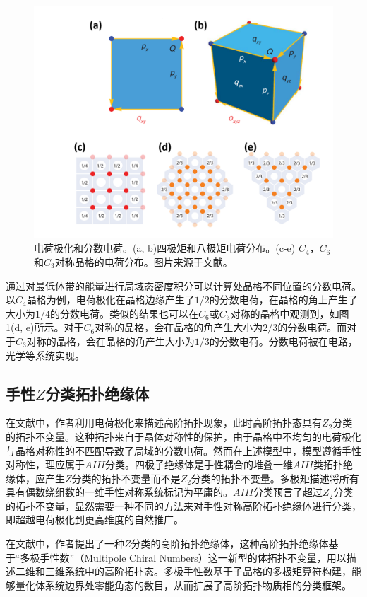 \begin{figure}[htbp]
    \centering
    \includegraphics[width=0.75\linewidth]{figure/Introduction/polarization.png}
    \caption{电荷极化和分数电荷。(a, b)四极矩和八极矩电荷分布。(c-e) $C_4$，$C_6$和$C_3$对称晶格的电荷分布。图片来源于文献\cite{benalcazar2019quantization}。}
    \label{fig:polarization}
\end{figure}

通过对最低体带的能量进行局域态密度积分可以计算处晶格不同位置的分数电荷。以$C_4$晶格为例，电荷极化在晶格边缘产生了$1/2$的分数电荷，在晶格的角上产生了大小为$1/4$的分数电荷。类似的结果也可以在$C_6$或$C_3$对称的晶格中观测到，如图\ref{fig:polarization}(d, e)所示。对于$C_6$对称的晶格，会在晶格的角产生大小为$2/3$的分数电荷。而对于$C_3$对称的晶格，会在晶格的角产生大小为$1/3$的分数电荷。分数电荷被在电路\cite{peterson2020fractional}，光学\cite{liu2021bulk}等系统实现。

\subsection{手性$Z$分类拓扑绝缘体}
在文献\cite{benalcazar2017quantized,benalcazar2019quantization}中，作者利用电荷极化来描述高阶拓扑现象，此时高阶拓扑态具有$Z_2$分类的拓扑不变量。这种拓扑来自于晶体对称性的保护，由于晶格中不均匀的电荷极化与晶格对称性的不匹配导致了局域的分数电荷。然而在上述模型中，模型遵循手性对称性，理应属于$AIII$分类。四极子绝缘体是手性耦合的堆叠一维$AIII$类拓扑绝缘体，应产生$Z$分类的拓扑不变量而不是$Z_2$分类的拓扑不变量\cite{benalcazar2022chiral}。多极矩描述将所有具有偶数绕组数的一维手性对称系统标记为平庸的。$AIII$分类预言了超过$Z_2$分类的拓扑不变量，显然需要一种不同的方法来对手性对称高阶拓扑绝缘体进行分类，即超越电荷极化到更高维度的自然推广。

在文献\cite{benalcazar2022chiral}中，作者提出了一种$Z$分类的高阶拓扑绝缘体，这种高阶拓扑绝缘体基于“多极手性数”（Multipole Chiral Numbers）这一新型的体拓扑不变量，用以描述二维和三维系统中的高阶拓扑态。多极手性数基于子晶格的多极矩算符构建，能够量化体系统边界处零能角态的数目，从而扩展了高阶拓扑物质相的分类框架。

